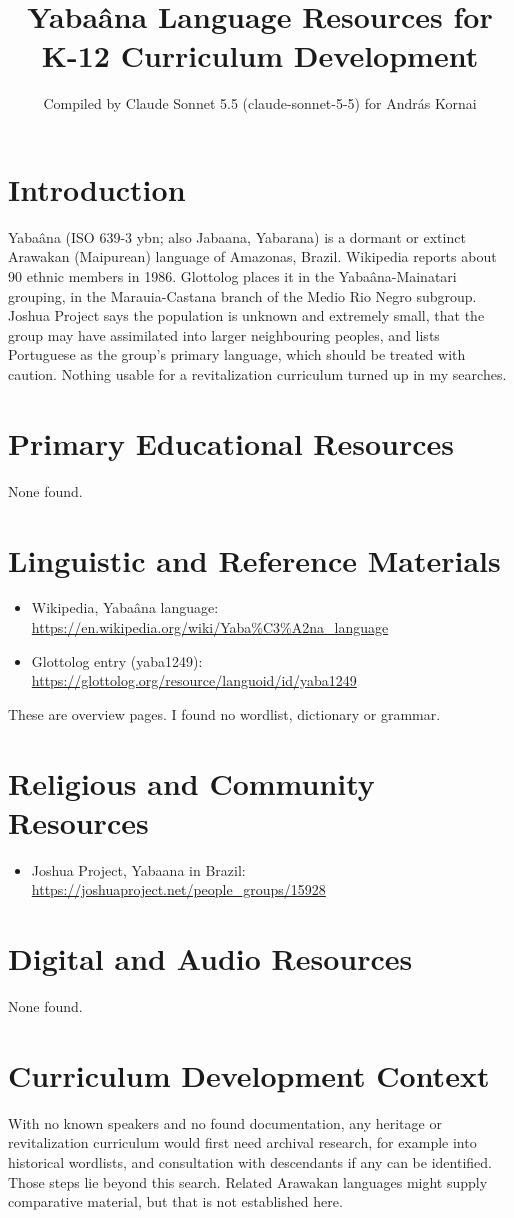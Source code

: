\documentclass[12pt]{article}
\title{Yaba\^ana Language Resources for K-12 Curriculum Development}
\author{Compiled by Claude Sonnet 5.5 (claude-sonnet-5-5) for Andr\'as Kornai}
\date{}
\begin{document}
\maketitle

\section{Introduction}
Yaba\^ana (ISO 639-3 ybn; also Jabaana, Yabarana) is a dormant or extinct Arawakan (Maipurean) language of Amazonas, Brazil. Wikipedia reports about 90 ethnic members in 1986. Glottolog places it in the Yabaâna-Mainatari grouping, in the Marauia-Castana branch of the Medio Rio Negro subgroup. Joshua Project says the population is unknown and extremely small, that the group may have assimilated into larger neighbouring peoples, and lists Portuguese as the group's primary language, which should be treated with caution. Nothing usable for a revitalization curriculum turned up in my searches.

\section{Primary Educational Resources}
None found.

\section{Linguistic and Reference Materials}
\begin{itemize}
\item Wikipedia, Yaba\^ana language: \url{https://en.wikipedia.org/wiki/Yaba%C3%A2na_language}
\item Glottolog entry (yaba1249): \url{https://glottolog.org/resource/languoid/id/yaba1249}
\end{itemize}
These are overview pages. I found no wordlist, dictionary or grammar.

\section{Religious and Community Resources}
\begin{itemize}
\item Joshua Project, Yabaana in Brazil: \url{https://joshuaproject.net/people_groups/15928}
\end{itemize}

\section{Digital and Audio Resources}
None found.

\section{Curriculum Development Context}
With no known speakers and no found documentation, any heritage or revitalization curriculum would first need archival research, for example into historical wordlists, and consultation with descendants if any can be identified. Those steps lie beyond this search. Related Arawakan languages might supply comparative material, but that is not established here.
\end{document}
